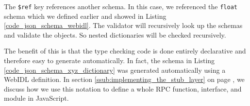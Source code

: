 The \lstinline{$ref} key references another schema. In this case, we referenced the \lstinline{float} schema which we defined earlier and showed in Listing \ref{code_json_schema_webidl}. The validator will recursively look up the schemas and validate the objects. So nested dictionaries will be checked recursively. 

The benefit of this is that the type checking code is done entirely declarative and therefore easy to generate automatically. In fact, the schema in Listing \ref{code_json_schema_xyz_dictionary} was generated automatically using a WebIDL definition. In section \ref{ssub:implementing_the_stub_layer} on page \pageref{ssub:implementing_the_stub_layer}, we discuss how we use this notation to define a whole RPC function, interface, and module in JavaScript.


